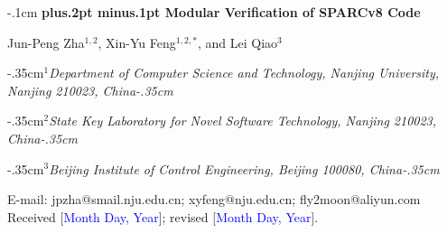 \documentclass[twoside]{article}
\def\title#1{\vspace{3mm}\begin{flushleft}\vglue-.1cm\Large\bf\boldmath\protect\baselineskip=18pt plus.2pt minus.1pt #1
\end{flushleft}\vspace{1mm} }
\def\author#1{\begin{flushleft}\normalsize #1\end{flushleft}\vspace*{-4pt} \vspace{3mm}}
\def\address#1#2{\begin{flushleft}\vglue-.35cm${}^{#1}$\small\it #2\vglue-.35cm\end{flushleft}\vspace{-2mm}\par}
\begin{document}
\begin{CJK*}{GBK}{song}
\thispagestyle{empty}
\vspace*{-13mm}
\vspace*{2mm}

\title{Modular Verification of SPARCv8 Code}

\author{Jun-Peng Zha$^{1,2}$, Xin-Yu Feng$^{1,2,*}$, and Lei Qiao$^{3}$}

\address{1}{Department of Computer Science and Technology, Nanjing University, Nanjing 210023, China}
\address{2}{State Key Laboratory for Novel Software Technology, Nanjing 210023, China}
\address{3}{Beijing Institute of Control Engineering, Beijing 100080, China}

\vspace{2mm}

\noindent E-mail: jpzha@smail.nju.edu.cn; xyfeng@nju.edu.cn;
fly2moon@aliyun.com  \\[-1mm]





\noindent Received [\textcolor{blue}{Month Day, Year}]; revised [\textcolor{blue}{Month Day, Year}].\\[1mm]


\end{CJK*}
\end{document}
